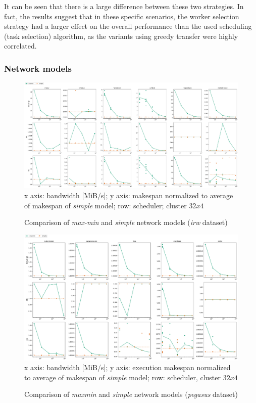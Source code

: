 It can be seen that there is a large difference between these two strategies. In fact, the results
suggest that in these specific scenarios, the worker selection strategy had a larger effect on the
overall performance than the used scheduling (task selection) algorithm, as the variants using
greedy transfer were highly correlated.

\subsubsection*{Network models}

\begin{figure}
	\caption{Comparison of \emph{max-min} and \emph{simple} network models
	(\emph{irw} dataset)}
	\label{fig:estee-chart-irw-netmodel}
	\centering
	\includegraphics[width=\textwidth]{imgs/estee/charts/irw-32x4-netmodel-score}\\
	{\small x axis: bandwidth [MiB/s]; y axis: makespan normalized to average
	of makespan of \emph{simple} model; row: scheduler; cluster $32x4$}
\end{figure}

\begin{figure}
	\caption{Comparison of \emph{maxmin} and \emph{simple} network models
	(\emph{pegasus} dataset)}
	\label{fig:estee-chart-pegasus-netmodel}
	\centering
	\includegraphics[width=\textwidth]{imgs/estee/charts/pegasus-32x4-netmodel-score}
	\\ {\small x axis: bandwidth [MiB/s]; y axis: execution makespan normalized
	to average of makespan of \emph{simple} model; row: scheduler, cluster
	$32x4$}
\end{figure}

